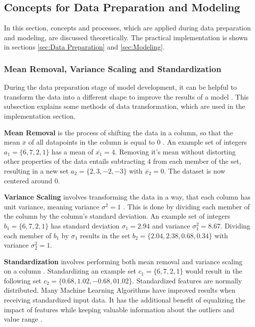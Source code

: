 \subsection{Concepts for Data Preparation and Modeling}

In this section, concepts and processes, which are applied during
data preparation and modeling, are discussed theoretically.
The practical implementation is shown in sections \ref{sec:Data Preparation} and \ref{sec:Modeling}.

\subsubsection{Mean Removal, Variance Scaling and Standardization}
\label{sec:Mean Removal, Variance Scaling and Standardization}
During the data preparation stage of model development, it can be helpful to transform the data into a different shape
to improve the results of a model \cite[35]{Subasi2020}. This subsection explains some methods of data transformation, which are used in the
implementation section.

\textbf{Mean Removal} is the process of shifting the data in a column, so that the mean $\overline{x}$ of all datapoints in the
column is equal to $0$ \cite{ScikitPreprocessing}.
An example set of integers $a_1 = \{6, 7, 2, 1\}$ has a mean of $\overline{x_1} = 4$.
Removing it's mean without distorting other properties of the data entails subtracting $4$ from each member of the
set, resulting in a new set $a_2 = \{2, 3, -2, -3\}$ with $\overline{x_2} = 0$. The dataset is now centered around $0$.

\textbf{Variance Scaling} involves transforming the data in a way, that each column has unit variance, meaning variance
$\sigma^2 = 1$ \cite{ScikitPreprocessing}. This is done by dividing each member of the column by the column's standard deviation.
An example set of integers $b_1 = \{6, 7, 2, 1\}$ has standard deviation $\sigma_1 = 2.94$ and variance $\sigma_1^2 = 8.67$.
Dividing each member of $b_1$ by $\sigma_1$ results in the set $b_2 = \{2.04, 2.38, 0.68, 0.34\}$ with variance $\sigma_2^2 = 1$.

\textbf{Standardization} involves performing both mean removal and variance scaling on a column \cite{ScikitPreprocessing}.
Standardizing an example set $c_1 = \{6, 7, 2, 1\}$ would result in the following set $c_2 = \{0.68, 1.02, -0.68, 01.02\}$.
Standardized features are normally distributed. Many Machine Learning Algorithms have improved results when receiving standardized input
data. It has the additional benefit of equalizing the impact of features while keeping valuable information about the outliers
and value range \cite[35]{Subasi2020}.


